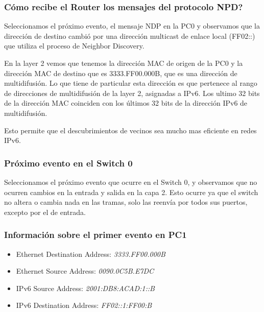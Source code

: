 \documentclass[a4paper,12pt]{article}
\begin{document}
\bigskip

\subsubsection{Cómo recibe el Router los mensajes del protocolo NPD?}

Seleccionamos el próximo evento, el mensaje NDP en la PC0 y observamos que la dirección de destino cambió por una dirección multicast de enlace local (FF02::) que utiliza el proceso de Neighbor Discovery. 

\bigskip

En la layer 2 vemos que tenemos la dirección MAC de origen de la PC0 y la dirección MAC de destino que es 3333.FF00.000B, que es una dirección de multidifusión. Lo que tiene de particular esta dirección es que pertenece al rango de direcciones de multidifusión de la layer 2, asignadas a IPv6. Los ultimo 32 bits de la dirección MAC coinciden con los últimos 32 bits de la dirección IPv6 de multidifusión.

\bigskip

Esto permite que el descubrimientos de vecinos sea mucho mas eficiente en redes IPv6.

\bigskip

\subsubsection{Próximo evento en el Switch 0}

Seleccionamos el próximo evento que ocurre en el Switch 0, y observamos que no ocurren cambios en la entrada y salida en la capa 2. Esto ocurre ya que el switch no altera o cambia nada en las tramas, solo las reenvía por todos sus puertos, excepto por el de entrada.

\bigskip

\subsubsection{Información sobre el primer evento en PC1}

\begin{itemize}
    \item Ethernet Destination Address: \textit{3333.FF00.000B}
    \item Ethernet Source Address: \textit{0090.0C5B.E7DC}
    \item IPv6 Source Address: \textit{2001:DB8:ACAD:1::B}
    \item IPv6 Destination Address: \textit{FF02::1:FF00:B}
\end{itemize}
\end{document}
